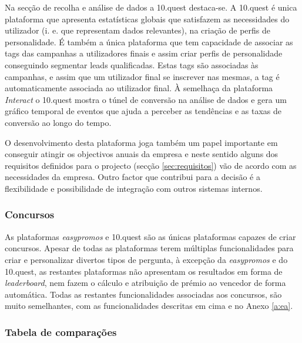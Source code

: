 Na secção de recolha e análise de dados a 10.quest destaca-se. A 10.quest é unica plataforma que apresenta estatísticas globais que satisfazem as necessidades do utilizador (i. e. que representam dados relevantes), na criação de perfis de personalidade. É também a única plataforma que tem capacidade de associar as tags das campanhas a utilizadores finais e assim criar perfis de personalidade conseguindo segmentar leads qualificadas. Estas tags são associadas às campanhas, e assim que um utilizador final se inscrever nas mesmas, a tag é automaticamente associada ao utilizador final.  À semelhaça da plataforma \textit{Interact} o 10.quest mostra o túnel de conversão na análise de dados e gera um gráfico temporal de eventos que ajuda a perceber as tendências e as taxas de conversão ao longo do tempo.

O desenvolvimento desta plataforma joga também um papel importante em conseguir atingir os objectivos anuais da empresa e neste sentido alguns dos requisitos definidos para o projecto (secção \ref{sec:requisitos}) vão de acordo com as necessidades da empresa. Outro factor que contribui para a decisão é a flexibilidade e possibilidade de integração com outros sistemas internos.

\subsubsection{Concursos}

As plataformas \textit{easypromos} e 10.quest são as únicas plataformas capazes de criar concursos. 
Apesar de todas as plataformas terem múltiplas funcionalidades para criar e personalizar divertos tipos de pergunta, à excepção da \textit{easypromos} e do 10.quest, as restantes plataformas não apresentam os resultados em forma de \textit{leaderboard}, nem fazem o cálculo e atribuição de prémio ao vencedor de forma automática.
Todas as restantes funcionalidades associadas aos concursos, são muito semelhantes, com as funcionalidades descritas em cima e no Anexo \ref{a:ea}. 

\subsubsection{Tabela de comparações}


